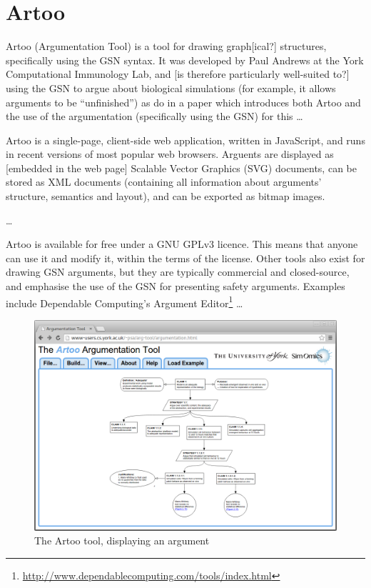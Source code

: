 \section{Artoo}

Artoo (Argumentation Tool) is a tool for drawing graph[ical?] structures, specifically using the GSN syntax. It was developed by Paul Andrews at the York Computational Immunology Lab, and [is therefore particularly well-suited to?] using the GSN to argue about biological simulations (for example, it allows arguments to be ``unfinished'') as \citet{royal} do in a paper which introduces both Artoo and the use of the argumentation (specifically using the GSN) for this \ldots {}

Artoo is a single-page, client-side web application, written in JavaScript, and runs in recent versions of most popular web browsers. Arguents are displayed as [embedded in the web page] Scalable Vector Graphics (SVG) documents, can be stored as XML documents (containing all information about arguments' structure, semantics and layout), and can be exported as bitmap images.

\ldots

Artoo is available for free under a GNU GPLv3 licence.
This means that anyone can use it and modify it, within the terms of the license.
Other tools also exist for drawing GSN arguments, but they are typically commercial and closed-source, and emphasise the use of the GSN for presenting safety arguments.
Examples include Dependable Computing's Argument Editor\footnote{\url{http://www.dependablecomputing.com/tools/index.html}} \ldots

\begin{figure}
  \centering
  \includegraphics[width=\textwidth]{graphics/artoo_screenshot.png}
  \caption{The Artoo tool, displaying an argument}
\end{figure}


